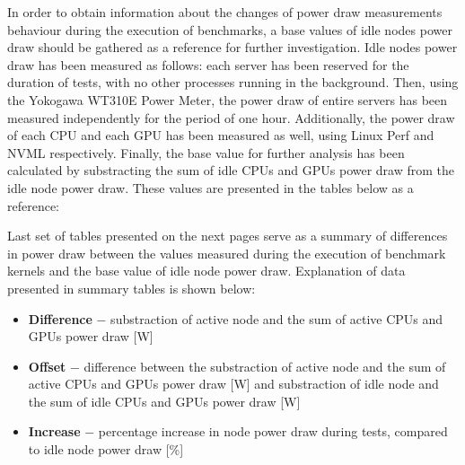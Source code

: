 
























\newpage
\FloatBarrier

In order to obtain information about the changes of power draw measurements
behaviour during the execution of benchmarks, a base values of idle nodes
power draw should be gathered as a reference for further investigation.
Idle nodes power draw has been measured as follows: each server has been
reserved for the duration of tests, with no other processes running in the
background. Then, using the Yokogawa WT310E Power Meter, the power draw of
entire servers has been measured independently for the period of one hour.
Additionally, the power draw of each CPU and each GPU has been measured
as well, using Linux Perf and NVML respectively. Finally, the base value
for further analysis has been calculated by substracting the sum of idle
CPUs and GPUs power draw from the idle node power draw. These values are
presented in the tables below as a reference:





Last set of tables presented on the next pages serve as a summary of
differences in power draw between the values measured during the execution
of benchmark kernels and the base value of idle node power draw.
Explanation of data presented in summary tables is shown below:

\begin{itemize}
    \item \textbf{Difference} $-$ substraction of active node and the sum of
    active CPUs and GPUs power draw [W]
    \item \textbf{Offset} $-$ difference between the substraction of active
    node and the sum of active CPUs and GPUs power draw [W] and substraction
    of idle node and the sum of idle CPUs and GPUs power draw [W]
    \item \textbf{Increase} $-$ percentage increase in node power draw during
    tests, compared to idle node power draw [\%]
\end{itemize}

